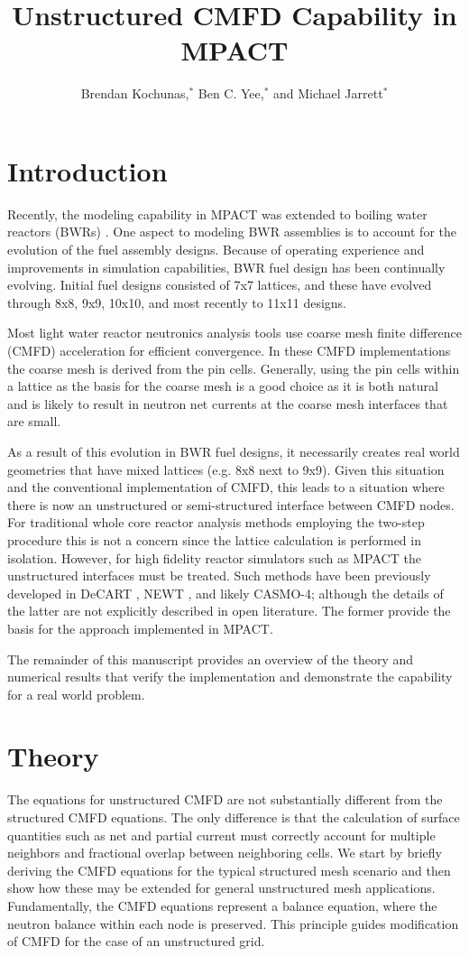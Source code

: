 \documentclass{anstrans}
\title{Unstructured CMFD Capability in MPACT}
\author{Brendan Kochunas,$^{*}$ Ben C. Yee,$^{*}$ and Michael Jarrett$^{*}$}
\institute{
$^{*}$University of Michigan, 2355 Bonisteel Blvd, Ann Arbor, MI 48109,
bkochuna@umich.edu, bcyee@umich.edu, jarremic@umich.edu
}
\begin{document}
\section{Introduction}
Recently, the modeling capability in MPACT \cite{MPACT2016} was extended to boiling water reactors (BWRs) \cite{Kochunas2017}. One aspect to modeling BWR assemblies is to account for the evolution of the fuel assembly designs. Because of operating experience and improvements in simulation capabilities, BWR fuel design has been continually evolving. Initial fuel designs consisted of 7x7 lattices, and these have evolved through 8x8, 9x9, 10x10, and most recently to 11x11 designs.

Most light water reactor neutronics analysis tools use coarse mesh finite difference (CMFD) acceleration for efficient convergence. In these CMFD implementations the coarse mesh is derived from the pin cells. Generally, using the pin cells within a lattice as the basis for the coarse mesh is a good choice as it is both natural and is likely to result in neutron net currents at the coarse mesh interfaces that are small.

As a result of this evolution in BWR fuel designs, it necessarily creates real world geometries that have mixed lattices (e.g. 8x8 next to 9x9). Given this situation and the conventional implementation of CMFD, this leads to a situation where there is now an unstructured or semi-structured interface between CMFD nodes. For traditional whole core reactor analysis methods employing the two-step procedure this is not a concern since the lattice calculation is performed in isolation. However, for high fidelity reactor simulators such as MPACT the unstructured interfaces must be treated. Such methods have been previously developed in DeCART \cite{Thomas2006,CHO2008}, NEWT \cite{Kim2011}, and likely CASMO-4\cite{Smith2002}; although the details of the latter are not explicitly described in open literature. The former provide the basis for the approach implemented in MPACT.

The remainder of this manuscript provides an overview of the theory and numerical results that verify the implementation and demonstrate the capability for a real world problem.

\section{Theory}
The equations for unstructured CMFD are not substantially different from the structured CMFD equations. The only difference is that the calculation of surface quantities such as net and partial current must correctly account for multiple neighbors and fractional overlap between neighboring cells. We start by briefly deriving the CMFD equations for the typical structured mesh scenario and then show how these may be extended for general unstructured mesh applications. Fundamentally, the CMFD equations represent a balance equation, where the neutron balance within each node is preserved. This principle guides modification of CMFD for the case of an unstructured grid.
\end{document}
